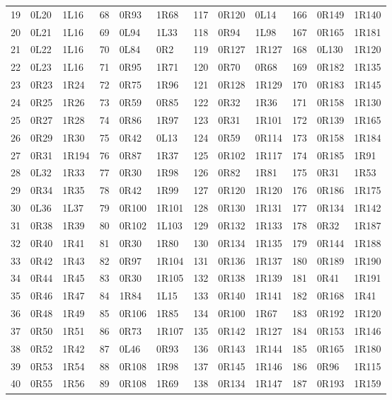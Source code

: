 \begin{longtable}{@{}rllrllrllrll@{}}
19 & 0L20 & 1L16 & 68 & 0R93 & 1R68 & 117 & 0R120 & 0L14 & 166 & 0R149 & 1R140\\
20 & 0L21 & 1L16 & 69 & 0L94 & 1L33 & 118 & 0R94 & 1L98 & 167 & 0R165 & 1R181\\
21 & 0L22 & 1L16 & 70 & 0L84 & 0R2 & 119 & 0R127 & 1R127 & 168 & 0L130 & 1R120\\
22 & 0L23 & 1L16 & 71 & 0R95 & 1R71 & 120 & 0R70 & 0R68 & 169 & 0R182 & 1R135\\
23 & 0R23 & 1R24 & 72 & 0R75 & 1R96 & 121 & 0R128 & 1R129 & 170 & 0R183 & 1R145\\
24 & 0R25 & 1R26 & 73 & 0R59 & 0R85 & 122 & 0R32 & 1R36 & 171 & 0R158 & 1R130\\
25 & 0R27 & 1R28 & 74 & 0R86 & 1R97 & 123 & 0R31 & 1R101 & 172 & 0R139 & 1R165\\
26 & 0R29 & 1R30 & 75 & 0R42 & 0L13 & 124 & 0R59 & 0R114 & 173 & 0R158 & 1R184\\
27 & 0R31 & 1R194 & 76 & 0R87 & 1R37 & 125 & 0R102 & 1R117 & 174 & 0R185 & 1R91\\
28 & 0L32 & 1R33 & 77 & 0R30 & 1R98 & 126 & 0R82 & 1R81 & 175 & 0R31 & 1R53\\
29 & 0R34 & 1R35 & 78 & 0R42 & 1R99 & 127 & 0R120 & 1R120 & 176 & 0R186 & 1R175\\
30 & 0L36 & 1L37 & 79 & 0R100 & 1R101 & 128 & 0R130 & 1R131 & 177 & 0R134 & 1R142\\
31 & 0R38 & 1R39 & 80 & 0R102 & 1L103 & 129 & 0R132 & 1R133 & 178 & 0R32 & 1R187\\
32 & 0R40 & 1R41 & 81 & 0R30 & 1R80 & 130 & 0R134 & 1R135 & 179 & 0R144 & 1R188\\
33 & 0R42 & 1R43 & 82 & 0R97 & 1R104 & 131 & 0R136 & 1R137 & 180 & 0R189 & 1R190\\
34 & 0R44 & 1R45 & 83 & 0R30 & 1R105 & 132 & 0R138 & 1R139 & 181 & 0R41 & 1R191\\
35 & 0R46 & 1R47 & 84 & 1R84 & 1L15 & 133 & 0R140 & 1R141 & 182 & 0R168 & 1R41\\
36 & 0R48 & 1R49 & 85 & 0R106 & 1R85 & 134 & 0R100 & 1R67 & 183 & 0R192 & 1R120\\
37 & 0R50 & 1R51 & 86 & 0R73 & 1R107 & 135 & 0R142 & 1R127 & 184 & 0R153 & 1R146\\
38 & 0R52 & 1R42 & 87 & 0L46 & 0R93 & 136 & 0R143 & 1R144 & 185 & 0R165 & 1R180\\
39 & 0R53 & 1R54 & 88 & 0R108 & 1R98 & 137 & 0R145 & 1R146 & 186 & 0R96 & 1R115\\
40 & 0R55 & 1R56 & 89 & 0R108 & 1R69 & 138 & 0R134 & 1R147 & 187 & 0R193 & 1R159\\

\end{longtable}
